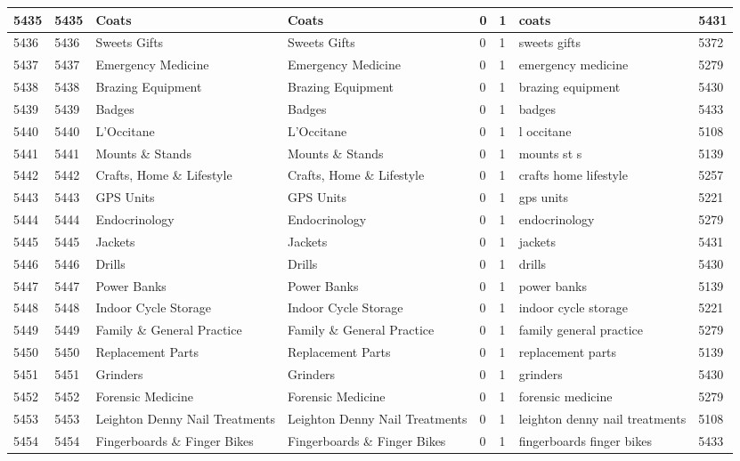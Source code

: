 \begin{longtable}{|l|l|l|l|l|l|l|l|}
5435 & 5435 & Coats & Coats & 0 & 1 & coats & 5431 \\ \hline 
5436 & 5436 & Sweets Gifts & Sweets Gifts & 0 & 1 & sweets gifts & 5372 \\ \hline 
5437 & 5437 & Emergency Medicine & Emergency Medicine & 0 & 1 & emergency medicine & 5279 \\ \hline 
5438 & 5438 & Brazing Equipment & Brazing Equipment & 0 & 1 & brazing equipment & 5430 \\ \hline 
5439 & 5439 & Badges & Badges & 0 & 1 & badges & 5433 \\ \hline 
5440 & 5440 & L'Occitane & L'Occitane & 0 & 1 & l occitane & 5108 \\ \hline 
5441 & 5441 & Mounts \& Stands & Mounts \& Stands & 0 & 1 & mounts st s & 5139 \\ \hline 
5442 & 5442 & Crafts, Home \& Lifestyle & Crafts, Home \& Lifestyle & 0 & 1 & crafts home lifestyle & 5257 \\ \hline 
5443 & 5443 & GPS Units & GPS Units & 0 & 1 & gps units & 5221 \\ \hline 
5444 & 5444 & Endocrinology & Endocrinology & 0 & 1 & endocrinology & 5279 \\ \hline 
5445 & 5445 & Jackets & Jackets & 0 & 1 & jackets & 5431 \\ \hline 
5446 & 5446 & Drills & Drills & 0 & 1 & drills & 5430 \\ \hline 
5447 & 5447 & Power Banks & Power Banks & 0 & 1 & power banks & 5139 \\ \hline 
5448 & 5448 & Indoor Cycle Storage & Indoor Cycle Storage & 0 & 1 & indoor cycle storage & 5221 \\ \hline 
5449 & 5449 & Family \& General Practice & Family \& General Practice & 0 & 1 & family general practice & 5279 \\ \hline 
5450 & 5450 & Replacement Parts & Replacement Parts & 0 & 1 & replacement parts & 5139 \\ \hline 
5451 & 5451 & Grinders & Grinders & 0 & 1 & grinders & 5430 \\ \hline 
5452 & 5452 & Forensic Medicine & Forensic Medicine & 0 & 1 & forensic medicine & 5279 \\ \hline 
5453 & 5453 & Leighton Denny Nail Treatments & Leighton Denny Nail Treatments & 0 & 1 & leighton denny nail treatments & 5108 \\ \hline 
5454 & 5454 & Fingerboards \& Finger Bikes & Fingerboards \& Finger Bikes & 0 & 1 & fingerboards finger bikes & 5433 \\ \hline 

\end{longtable}
